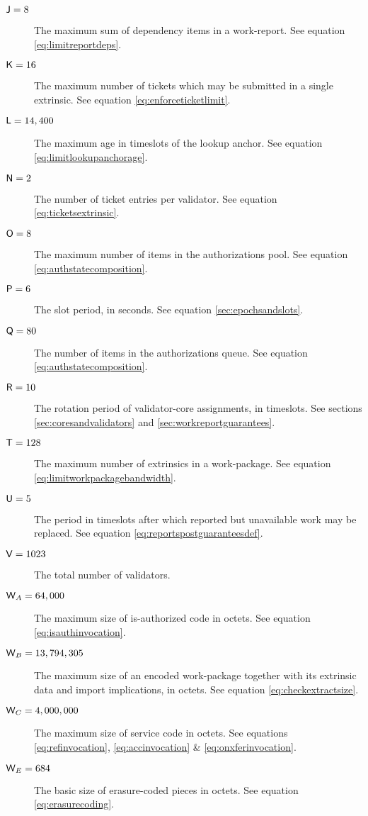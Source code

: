 \begin{description}
  \item[$\mathsf{J} = 8$] The maximum sum of dependency items in a work-report. See equation \ref{eq:limitreportdeps}.
  \item[$\mathsf{K} = 16$] The maximum number of tickets which may be submitted in a single extrinsic. See equation \ref{eq:enforceticketlimit}.
  \item[$\mathsf{L} = 14,400$] The maximum age in timeslots of the lookup anchor. See equation \ref{eq:limitlookupanchorage}.
  \item[$\mathsf{N} = 2$] The number of ticket entries per validator. See equation \ref{eq:ticketsextrinsic}.
  \item[$\mathsf{O} = 8$] The maximum number of items in the authorizations pool. See equation \ref{eq:authstatecomposition}.
  \item[$\mathsf{P} = 6$] The slot period, in seconds. See equation \ref{sec:epochsandslots}.
  \item[$\mathsf{Q} = 80$] The number of items in the authorizations queue. See equation \ref{eq:authstatecomposition}.
  \item[$\mathsf{R} = 10$] The rotation period of validator-core assignments, in timeslots. See sections \ref{sec:coresandvalidators} and \ref{sec:workreportguarantees}.
  \item[$\mathsf{T} = 128$] The maximum number of extrinsics in a work-package. See equation \ref{eq:limitworkpackagebandwidth}.
  \item[$\mathsf{U} = 5$] The period in timeslots after which reported but unavailable work may be replaced. See equation \ref{eq:reportspostguaranteesdef}.
  \item[$\mathsf{V} = 1023$] The total number of validators.
  \item[$\mathsf{W}_A = 64,000$] The maximum size of is-authorized code in octets. See equation \ref{eq:isauthinvocation}.
  \item[$\mathsf{W}_B = 13,794,305$] The maximum size of an encoded work-package together with its extrinsic data and import implications, in octets. See equation \ref{eq:checkextractsize}.
  \item[$\mathsf{W}_C = 4,000,000$] The maximum size of service code in octets. See equations \ref{eq:refinvocation}, \ref{eq:accinvocation} \& \ref{eq:onxferinvocation}.
  \item[$\mathsf{W}_E = 684$] The basic size of erasure-coded pieces in octets. See equation \ref{eq:erasurecoding}.

\end{description}
